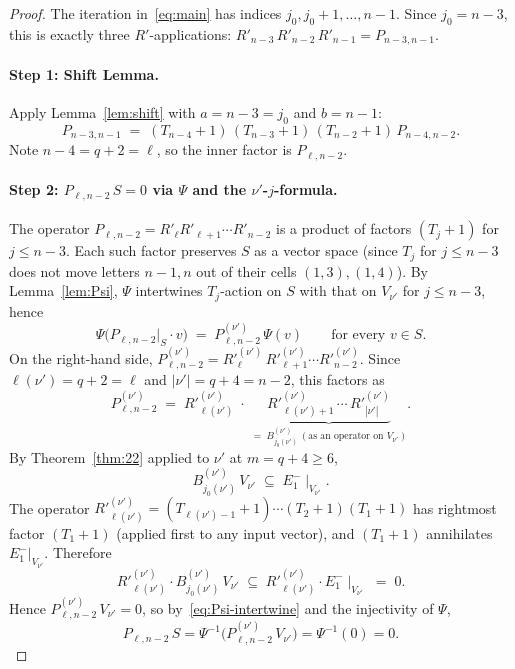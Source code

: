 \documentclass[11pt]{article}
\theoremstyle{definition}
\begin{document}
\begin{proof}
The iteration in~\eqref{eq:main} has indices $j_0, j_0+1, \ldots,
n-1$. Since $j_0 = n - 3$, this is exactly three $R'$-applications:
$R'_{n-3}\, R'_{n-2}\, R'_{n-1} = P_{n-3, n-1}$.

\paragraph{Step 1: Shift Lemma.}
Apply Lemma~\ref{lem:shift} with $a = n - 3 = j_0$ and $b = n - 1$:
\begin{equation}\label{eq:shift-app}
   P_{n-3, n-1}
   \;=\; (T_{n-4}+1)\,(T_{n-3}+1)\,(T_{n-2}+1)\,
         P_{n-4, n-2}.
\end{equation}
Note $n - 4 = q + 2 = \ell$, so the inner factor is
$P_{\ell, n-2}$.

\paragraph{Step 2: $P_{\ell, n-2}\,S = 0$ via $\Psi$ and the $\nu'$-$j$-formula.}
The operator $P_{\ell, n-2} = R'_\ell R'_{\ell+1} \cdots R'_{n-2}$ is a
product of factors $(T_j{+}1)$ for $j \le n - 3$. Each such factor
preserves $S$ as a vector space (since $T_j$ for $j \le n - 3$ does
not move letters $n - 1, n$ out of their cells $(1, 3), (1, 4)$). By
Lemma~\ref{lem:Psi}, $\Psi$ intertwines $T_j$-action on $S$ with that
on $V_{\nu'}$ for $j \le n - 3$, hence
\begin{equation}\label{eq:Psi-intertwine}
   \Psi\big( P_{\ell, n-2}|_S \cdot v \big)
   \;=\; P^{(\nu')}_{\ell, n-2}\,\Psi(v)
   \qquad \text{for every } v \in S.
\end{equation}
On the right-hand side, $P^{(\nu')}_{\ell, n-2}
= R'^{(\nu')}_\ell\, R'^{(\nu')}_{\ell+1} \cdots R'^{(\nu')}_{n-2}$.
Since $\ell(\nu') = q + 2 = \ell$ and $|\nu'| = q + 4 = n - 2$, this
factors as
\[
   P^{(\nu')}_{\ell, n-2}
   \;=\; R'^{(\nu')}_{\ell(\nu')}\;\cdot\;
   \underbrace{R'^{(\nu')}_{\ell(\nu')+1}\,\cdots\,R'^{(\nu')}_{|\nu'|}}_{
      =\; B^{(\nu')}_{j_0(\nu')}\,(\text{as an operator on } V_{\nu'})
   }.
\]
By Theorem~\ref{thm:22} applied to $\nu'$ at $m = q + 4 \ge 6$,
\[
   B^{(\nu')}_{j_0(\nu')}\,V_{\nu'}
   \;\subseteq\; E_1^-\!\mid_{V_{\nu'}}.
\]
The operator $R'^{(\nu')}_{\ell(\nu')} = (T_{\ell(\nu')-1}+1) \cdots
(T_2+1)(T_1+1)$ has rightmost factor $(T_1+1)$ (applied first to any
input vector), and $(T_1+1)$ annihilates $E_1^-|_{V_{\nu'}}$. Therefore
\[
   R'^{(\nu')}_{\ell(\nu')} \cdot B^{(\nu')}_{j_0(\nu')}\, V_{\nu'}
   \;\subseteq\;
   R'^{(\nu')}_{\ell(\nu')} \cdot E_1^-\!\mid_{V_{\nu'}}
   \;=\; 0.
\]
Hence $P^{(\nu')}_{\ell, n-2}\, V_{\nu'} = 0$, so
by~\eqref{eq:Psi-intertwine} and the injectivity of $\Psi$,
\[
   P_{\ell, n-2}\,S = \Psi^{-1}\big(P^{(\nu')}_{\ell, n-2}\,V_{\nu'}\big)
   = \Psi^{-1}(0) = 0.
\]


\end{proof}
\end{document}
